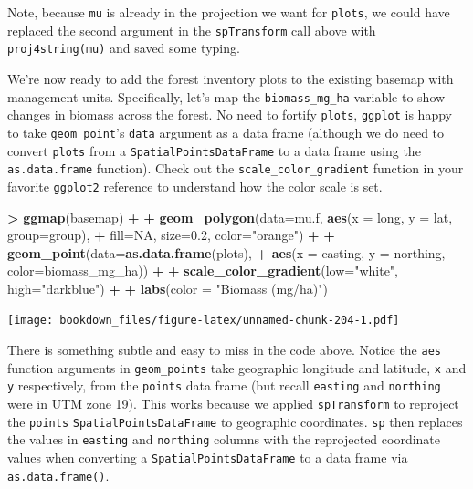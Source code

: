 \documentclass[
]{krantz}
\makeatletter
\newenvironment{Shaded}{\begin{snugshade}}{\end{snugshade}}
\newcommand{\DataTypeTok}[1]{\textcolor[rgb]{0.27,0.27,0.27}{#1}}
\newcommand{\FloatTok}[1]{\textcolor[rgb]{0.06,0.06,0.06}{#1}}
\newcommand{\KeywordTok}[1]{\textcolor[rgb]{0.27,0.27,0.27}{\textbf{#1}}}
\newcommand{\NormalTok}[1]{#1}
\newcommand{\OperatorTok}[1]{\textcolor[rgb]{0.43,0.43,0.43}{\textbf{#1}}}
\newcommand{\OtherTok}[1]{\textcolor[rgb]{0.37,0.37,0.37}{#1}}
\newcommand{\StringTok}[1]{\textcolor[rgb]{0.5,0.5,0.5}{#1}}
\newenvironment{kframe}{%
\medskip{}
\setlength{\fboxsep}{.8em}
 \def\at@end@of@kframe{}%
 \ifinner\ifhmode%
  \def\at@end@of@kframe{\end{minipage}}%
  \begin{minipage}{\columnwidth}%
 \fi\fi%
 \def\FrameCommand##1{\hskip\@totalleftmargin \hskip-\fboxsep
 \colorbox{shadecolor}{##1}\hskip-\fboxsep
     \hskip-\linewidth \hskip-\@totalleftmargin \hskip\columnwidth}%
 \MakeFramed {\advance\hsize-\width
   \@totalleftmargin\z@ \linewidth\hsize
   \@setminipage}}%
 {\par\unskip\endMakeFramed%
 \at@end@of@kframe}
\renewenvironment{Shaded}{\begin{kframe}}{\end{kframe}}
\makeatother
\begin{document}
Note, because \texttt{mu} is already in the projection we want for \texttt{plots}, we could have replaced the second argument in the \texttt{spTransform} call above with \texttt{proj4string(mu)} and saved some typing.

We're now ready to add the forest inventory plots to the existing basemap with management units. Specifically, let's map the \texttt{biomass\_mg\_ha} variable to show changes in biomass across the forest. No need to fortify \texttt{plots}, \texttt{ggplot} is happy to take \texttt{geom\_point}'s \texttt{data} argument as a data frame (although we do need to convert \texttt{plots} from a \texttt{SpatialPointsDataFrame} to a data frame using the \texttt{as.data.frame} function). Check out the \texttt{scale\_color\_gradient} function in your favorite \texttt{ggplot2} reference to understand how the color scale is set.

\begin{Shaded}
\begin{Highlighting}[]
\OperatorTok{\textgreater{}}\StringTok{ }\KeywordTok{ggmap}\NormalTok{(basemap) }\OperatorTok{+}
\OperatorTok{+}\StringTok{     }\KeywordTok{geom\_polygon}\NormalTok{(}\DataTypeTok{data=}\NormalTok{mu.f, }\KeywordTok{aes}\NormalTok{(}\DataTypeTok{x =}\NormalTok{ long, }\DataTypeTok{y =}\NormalTok{ lat, }\DataTypeTok{group=}\NormalTok{group), }
\OperatorTok{+}\StringTok{                  }\DataTypeTok{fill=}\OtherTok{NA}\NormalTok{, }\DataTypeTok{size=}\FloatTok{0.2}\NormalTok{, }\DataTypeTok{color=}\StringTok{"orange"}\NormalTok{) }\OperatorTok{+}
\OperatorTok{+}\StringTok{     }\KeywordTok{geom\_point}\NormalTok{(}\DataTypeTok{data=}\KeywordTok{as.data.frame}\NormalTok{(plots), }
\OperatorTok{+}\StringTok{                }\KeywordTok{aes}\NormalTok{(}\DataTypeTok{x =}\NormalTok{ easting, }\DataTypeTok{y =}\NormalTok{ northing, }\DataTypeTok{color=}\NormalTok{biomass\_mg\_ha)) }\OperatorTok{+}\StringTok{ }
\OperatorTok{+}\StringTok{     }\KeywordTok{scale\_color\_gradient}\NormalTok{(}\DataTypeTok{low=}\StringTok{"white"}\NormalTok{, }\DataTypeTok{high=}\StringTok{"darkblue"}\NormalTok{) }\OperatorTok{+}
\OperatorTok{+}\StringTok{     }\KeywordTok{labs}\NormalTok{(}\DataTypeTok{color =} \StringTok{"Biomass (mg/ha)"}\NormalTok{)}
\end{Highlighting}
\end{Shaded}

\texttt{[image: bookdown\_files/figure-latex/unnamed-chunk-204-1.pdf]}

There is something subtle and easy to miss in the code above. Notice the \texttt{aes} function arguments in \texttt{geom\_points} take geographic longitude and latitude, \texttt{x} and \texttt{y} respectively, from the \texttt{points} data frame (but recall \texttt{easting} and \texttt{northing} were in UTM zone 19). This works because we applied \texttt{spTransform} to reproject the \texttt{points} \texttt{SpatialPointsDataFrame} to geographic coordinates. \texttt{sp} then replaces the values in \texttt{easting} and \texttt{northing} columns with the reprojected coordinate values when converting a \texttt{SpatialPointsDataFrame} to a data frame via \texttt{as.data.frame()}.
\end{document}
